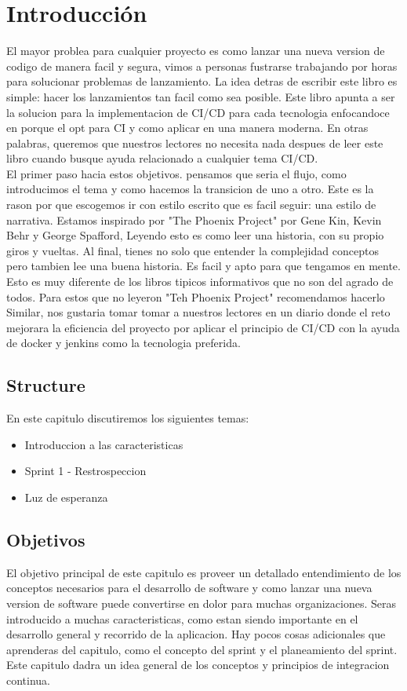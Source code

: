 \chapter{Introducción}
El mayor problea para cualquier proyecto es como lanzar una nueva version de codigo de manera facil y segura, vimos a personas fustrarse trabajando por horas para solucionar problemas de lanzamiento. La idea detras de escribir este libro es simple: hacer los lanzamientos tan facil como sea posible. Este libro apunta a ser la solucion para la implementacion de CI/CD para cada tecnologia enfocandoce en porque el opt para CI y como aplicar en una manera moderna. En otras palabras, queremos que nuestros lectores no necesita nada despues de leer este libro cuando busque ayuda relacionado a cualquier tema CI/CD.
\\
El primer paso hacia estos objetivos. pensamos que seria el flujo, como introducimos el tema y como hacemos la transicion de uno a otro. Este es la rason por que escogemos ir con estilo escrito que es facil seguir: una estilo de narrativa.  Estamos inspirado por "The Phoenix Project" por Gene Kin, Kevin Behr y George Spafford, Leyendo esto es como leer una historia, con su propio giros y vueltas. Al final, tienes no solo que entender la complejidad conceptos pero tambien lee una buena historia. Es facil y apto para que tengamos en mente. Esto es muy diferente de los libros tipicos informativos que no son del agrado de todos. Para estos que no leyeron "Teh Phoenix Project" recomendamos hacerlo\\
Similar, nos gustaria tomar tomar a nuestros lectores en un diario donde el reto mejorara la eficiencia del proyecto por aplicar el principio de CI/CD con la ayuda de docker y jenkins como la tecnologia preferida.
\section{Structure}
En este capitulo discutiremos los siguientes temas:
\begin{itemize}
  \item Introduccion a las caracteristicas
  \item Sprint 1 - Restrospeccion
  \item Luz de esperanza
\end{itemize}
\section{Objetivos}
El objetivo principal de este capitulo es proveer un detallado entendimiento de los conceptos necesarios para el desarrollo de software y como lanzar una nueva version de software puede convertirse en dolor para muchas organizaciones. Seras introducido a muchas caracteristicas, como estan siendo importante en el desarrollo general y recorrido de la aplicacion.
Hay pocos cosas adicionales que aprenderas del capitulo, como el concepto del sprint y el planeamiento del sprint. Este capitulo dadra un idea general de los conceptos y principios de integracion continua.
